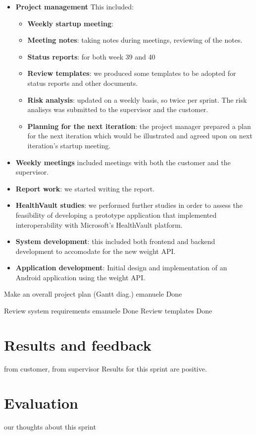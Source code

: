 \begin{itemize}
	\item \textbf{Project management}\newline
	This included:
	\begin{itemize}
		\item \textbf{Weekly startup meeting}:
		\item \textbf{Meeting notes}:
			taking notes during meetings, reviewing of the notes.
		\item \textbf{Status reports}:
			for both week 39 and 40
		\item \textbf{Review templates}:
			we produced some templates to be adopted for status reports and other documents.
		\item \textbf{Risk analysis}:
			updated on a weekly basis, so twice per sprint.
			The risk analisys was submitted to the supervisor and the customer.
		\item \textbf{Planning for the next iteration}:
			the project manager prepared a plan for the next iteration
			which would be illustrated and agreed upon on next iteration's startup meeting.
	\end{itemize}
	\item \textbf{Weekly meetings}
		included meetings with both the customer and the supervisor.
	\item \textbf{Report work}:
		we started writing the report.
	\item \textbf{HealthVault studies}:
		we performed further studies in order to assess the feasibility of developing a prototype
		application that implemented interoperability with Microsoft's HealthVault platform.
	\item \textbf{System development}:
		this included both frontend and backend development to accomodate for the new weight API.
	\item \textbf{Application development}:
		Initial design and implementation of an Android application using the weight API.


\end{itemize}



Make an overall project plan (Gantt diag.)	emanuele	Done

Review system requirements	emanuele	Done
Review templates	Done


\section{Results and feedback}
from customer, from supervisor
Results for this sprint are positive.

\section{Evaluation}
our thoughts about this sprint